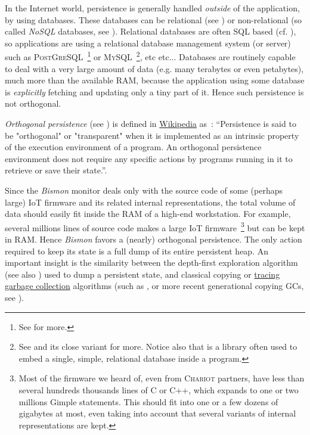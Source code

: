 In the Internet world, persistence is generally handled \emph{outside}
of the application, by using  databases. These
databases can be relational (see \cite{Date:2005:Database-in-Depth})
or non-relational (so called \emph{NoSQL} databases, see
\cite{RAJ-2018-NoSQL}). Relational databases are often SQL based
(cf. \cite{Date:2011:SQL-relth}), so applications are using a
relational database management system (or server) such as
\textsc{PostGreSQL}~\footnote{See  for
  more.} or \textsc{MySQL}~\footnote{See  and
  its close variant  for more. Notice also
  that  is a library often used to embed a
  single, simple, relational database inside a program.}, etc etc...
Databases are routinely capable to deal with a very large amount of
data (e.g. many terabytes or even petabytes), much more than the
available RAM, because the application using some database is
\emph{explicitly} fetching and updating only a tiny part of it. Hence
such persistence is not orthogonal.

\emph{Orthogonal persistence} 
 (see \cite{Dearle-2010-orthopersist})
is defined in
\href{https://en.wikipedia.org/wiki/Persistence\_(computer\_science)\#Orthogonal\_or\_transparent\_persistence}{Wikipedia} as~: ``Persistence is said to be "orthogonal" or "transparent" when it is
implemented as an intrinsic property of the execution environment of a
program. An orthogonal persistence environment does not require any
specific actions by programs running in it to retrieve or save their
state.''.

Since the \emph{Bismon} monitor deals only with the source code of
some (perhaps large) IoT firmware and its related internal
representations, the total volume of data should easily fit inside the
RAM of a high-end workstation. For example, several millions lines of
source code makes a large IoT firmware~\footnote{Most of the firmware
we heard of, even from \textsc{Chariot} partners, have less than
several hundreds thousands lines of C or C++, which expands to one or
two millions Gimple statements. This should fit into one or a few
dozens of gigabytes at most, even taking into account that several
variants of internal representations are kept.} but can be kept in
RAM. Hence \emph{Bismon} favors a (nearly) orthogonal persistence. The
only action required to keep its state is a full dump of its entire
persistent heap. An important insight is the similarity between the
depth-first  
 exploration  algorithm
 (see also \cite{Cormen:2009:Intro-algo,
  Christian:2017:algorithms}) used to dump  a persistent
 state, and classical copying or
\href{https://en.wikipedia.org/wiki/Tracing\_garbage\_collection}{tracing
  garbage collection} 
 
algorithms (such as \cite{Cheney:1970:CopyingGc}, or more recent
generational copying GCs, see \cite{Jones:2016:GC-handbook}).

